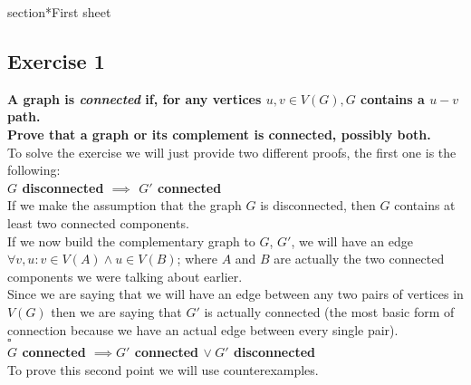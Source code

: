 section*{First sheet} 
\subsection*{Exercise 1} 
\boldmath \textbf{A graph is \textit{connected} if, for any vertices $u, v \in V(G), G$ contains a 
$u - v$ path.\\ 
Prove that a graph or its complement is connected, possibly both.} \vspace{10pt}\\ \unboldmath 
To solve the exercise we will just provide two different proofs, the first one is the following:
\vspace{5pt}\\ \boldmath 
\textbf{$G$ disconnected $\implies$ $G'$ connected}\vspace{5pt}\\ \unboldmath 
If we make the assumption that the graph $G$ is disconnected, then $G$ contains at least two 
connected components.\\ 
If we now build the complementary graph to $G$, $G'$, we will have an edge $\forall v, u : v \in 
V(A) \land u \in V(B)$; where $A$ and $B$ are actually the two connected components we were talking 
about earlier.\\
Since we are saying that we will have an edge between any two pairs of vertices in $V(G)$ then we
are saying that $G'$ is actually connected (the most basic form of connection because we have an
actual edge between every single pair). 
\vspace{2pt}\\\hspace*{3cm}$\square$\vspace*{10pt}\\
\boldmath \textbf{$G$ connected $\implies G'$ connected $\vee\hspace{3pt} G'$
disconnected}\vspace{5pt}\\ \unboldmath 
To prove this second point we will use counterexamples. \\
